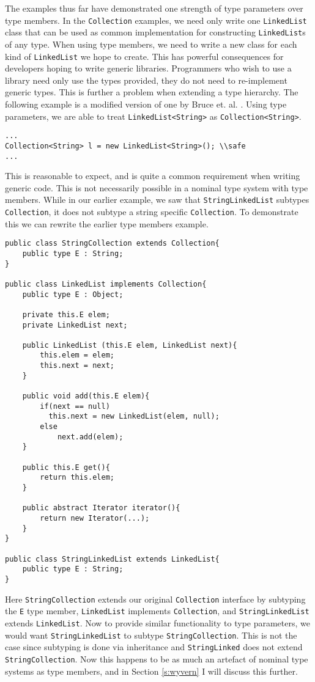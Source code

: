 \documentclass[11pt
              , a4paper
              , twoside
              , openright
              ]{report}
\numberwithin{case}{theorem}
\numberwithin{subcase}{case}
\begin{document}
The examples thus far have demonstrated one strength of type parameters over type members. In the \verb|Collection| examples, we need only write one \verb|LinkedList| class that can be used as common implementation for constructing \verb|LinkedList|s of any type. When using type members, we need to write a new class for each kind of \verb|LinkedList| we hope to create. This has powerful consequences for developers hoping to write generic libraries. Programmers who wish to use a library need only use the types provided, they do not need to re-implement generic types. This is further a problem when extending a type hierarchy. The following example is a modified version of one by Bruce et. al. \cite{Bruce:1998:SSA:646155.679691}. Using type parameters, we are able to treat \verb|LinkedList<String>| as \verb|Collection<String>|.
\begin{lstlisting}[mathescape, style=custom_lang]
...
Collection<String> l = new LinkedList<String>(); \\safe
...
\end{lstlisting}
This is reasonable to expect, and is quite a common requirement when writing generic code. This is not necessarily possible in a nominal type system with type members. While in our earlier example, we saw that \verb|StringLinkedList| subtypes \verb|Collection|, it does not subtype a string specific \verb|Collection|. To demonstrate this we can rewrite the earlier type members example.
\begin{lstlisting}[mathescape, style=custom_lang]
public class StringCollection extends Collection{
	public type E : String;
}

public class LinkedList implements Collection{
	public type E : Object;

	private this.E elem;
	private LinkedList next;
	
	public LinkedList (this.E elem, LinkedList next){
		this.elem = elem;
		this.next = next;
	}
	
	public void add(this.E elem){
		if(next == null)
		  this.next = new LinkedList(elem, null);
		else
			next.add(elem);
	}
	
	public this.E get(){
		return this.elem;
	}
	
	public abstract Iterator iterator(){
		return new Iterator(...);
	}
}

public class StringLinkedList extends LinkedList{
	public type E : String;
}
\end{lstlisting}
Here \verb|StringCollection| extends our original \verb|Collection| interface by subtyping the \verb|E| type member, \verb|LinkedList| implements \verb|Collection|, and \verb|StringLinkedList| extends \verb|LinkedList|. Now to provide similar functionality to type parameters, we would want \verb|StringLinkedList| to subtype \verb|StringCollection|. This is not the case since subtyping is done via inheritance and \verb|StringLinked| does not extend \verb|StringCollection|. Now this happens to be as much an artefact of nominal type systems as type members, and in Section \ref{s:wyvern} I will discuss this further.
\end{document}
